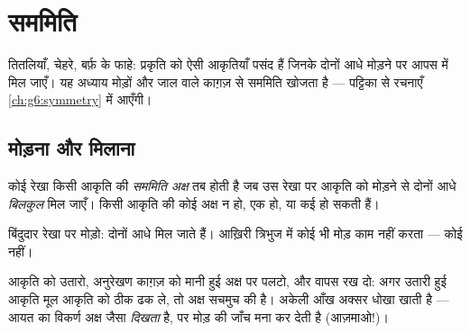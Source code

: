 \chapter{सममिति}\label{ch:g4:symmetry}

तितलियाँ, चेहरे, बर्फ़ के फाहे: प्रकृति को ऐसी आकृतियाँ पसंद हैं
जिनके दोनों आधे मोड़ने पर आपस में मिल जाएँ। यह अध्याय मोड़ों और
जाल वाले काग़ज़ से सममिति खोजता है ---  पट्टिका से रचनाएँ
\cref{ch:g6:symmetry} में आएँगी।

\section{मोड़ना और मिलाना}

\begin{definition}[सममिति अक्ष]\label{def:g4:symmetry:def}
कोई रेखा किसी आकृति की \emph{सममिति अक्ष} तब
होती है जब उस रेखा पर आकृति को मोड़ने से दोनों आधे
\emph{बिलकुल} मिल जाएँ। किसी आकृति की कोई अक्ष न हो, एक हो, या
कई हो सकती हैं।
\end{definition}

\begin{omfigure}

{\small बिंदुदार रेखा पर मोड़ो: दोनों आधे मिल जाते हैं। आख़िरी
त्रिभुज में कोई भी मोड़ काम नहीं करता --- कोई  नहीं।}
\end{omfigure}

\begin{example}[अनुरेखण काग़ज़ से जाँच]\label{ex:g4:symmetry:trace}
आकृति को उतारो, अनुरेखण काग़ज़ को मानी हुई अक्ष पर पलटो, और वापस
रख दो: अगर उतारी हुई आकृति मूल आकृति को ठीक ढक ले, तो अक्ष सचमुच
की है। अकेली आँख अक्सर धोखा खाती है --- आयत का विकर्ण अक्ष जैसा
\emph{दिखता} है, पर मोड़ की जाँच मना कर देती है (आज़माओ!)।
\end{example}

